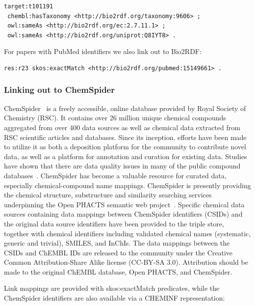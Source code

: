 \documentclass[10pt]{bmc_article}
\newenvironment{bmcformat}{\begin{raggedright}\baselineskip20pt\sloppy\setboolean{publ}{false}}{\end{raggedright}\baselineskip20pt\sloppy}
\begin{document}
\begin{bmcformat}
\begin{small}
\begin{verbatim}
target:t101191
 chembl:hasTaxonomy <http://bio2rdf.org/taxonomy:9606> ;
 owl:sameAs <http://bio2rdf.org/ec:2.7.11.1> ;
 owl:sameAs <http://bio2rdf.org/uniprot:Q8IYT8> .
\end{verbatim}
\end{small}

For papers with PubMed identifiers we also link out to Bio2RDF:

\begin{small}
\begin{verbatim}
res:r23 skos:exactMatch <http://bio2rdf.org/pubmed:15149661> .
\end{verbatim}
\end{small}

\subsubsection*{Linking out to ChemSpider}

ChemSpider~\cite{Pence2010} is a freely accessible, online database provided by Royal Society of Chemistry (RSC).
It contains over 26 million unique
chemical compounds aggregated from over 400 data sources as well as chemical data extracted
from RSC scientific articles and databases. Since its inception, efforts have been made to
utilize it as both a deposition platform for the community to contribute novel data, as
well as a platform for annotation and curation for existing data. Studies have shown that there are data
quality issues in many of the public compound databases~\cite{Williams2011}. ChemSpider has become a
valuable resource for curated data, especially chemical-compound name mappings. ChemSpider
is presently providing the chemical structure, substructure and similarity searching services 
underpinning the Open PHACTS semantic web project~\cite{Williams2012}. Specific chemical data 
sources containing data mappings between ChemSpider identifiers (CSIDs) and the original data 
source identifiers have been provided to the triple store, together with chemical identifiers 
including validated chemical names (systematic, generic and trivial), SMILES, and InChIs. 
The data mappings between the CSIDs and ChEMBL IDs are released to the 
community under the Creative Common Attribution-Share Alike license (CC-BY-SA 3.0). Attribution 
should be made to the original ChEMBL database, Open PHACTS, and ChemSpider.

Link mappings are provided with skos:exactMatch predicates, while the ChemSpider identifiers
are also available via a CHEMINF representation:
 

\end{bmcformat}
\end{document}
